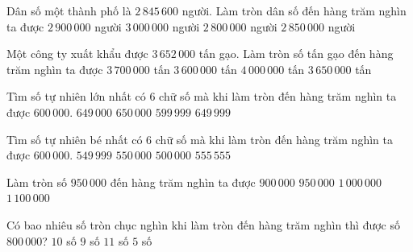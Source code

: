 \begin{ex} %
Dân số một thành phố là $2\,845\,600$ người. Làm tròn dân số đến hàng trăm nghìn ta được
\choice
{$2\,900\,000$ người}
{$3\,000\,000$ người}
{\True $2\,800\,000$ người}
{$2\,850\,000$ người}
\end{ex}

\begin{ex} %
Một công ty xuất khẩu được $3\,652\,000$ tấn gạo. Làm tròn số tấn gạo đến hàng trăm nghìn ta được
\choice
{\True $3\,700\,000$ tấn}
{$3\,600\,000$ tấn}
{$4\,000\,000$ tấn}
{$3\,650\,000$ tấn}
\end{ex}

\begin{ex} %
Tìm số tự nhiên lớn nhất có 6 chữ số mà khi làm tròn đến hàng trăm nghìn ta được $600\,000$.
\choice
{$649\,000$}
{$650\,000$}
{$599\,999$}
{\True $649\,999$}
\end{ex}

\begin{ex} %
Tìm số tự nhiên bé nhất có 6 chữ số mà khi làm tròn đến hàng trăm nghìn ta được $600\,000$.
\choice
{$549\,999$}
{\True $550\,000$}
{$500\,000$}
{$555\,555$}
\end{ex}

\begin{ex} %
Làm tròn số $950\,000$ đến hàng trăm nghìn ta được
\choice
{$900\,000$}
{$950\,000$}
{\True $1\,000\,000$}
{$1\,100\,000$}
\end{ex}

\begin{ex} %
Có bao nhiêu số tròn chục nghìn khi làm tròn đến hàng trăm nghìn thì được số $800\,000$?
\choice
{\True $10$ số}
{$9$ số}
{$11$ số}
{$5$ số}
\end{ex}

